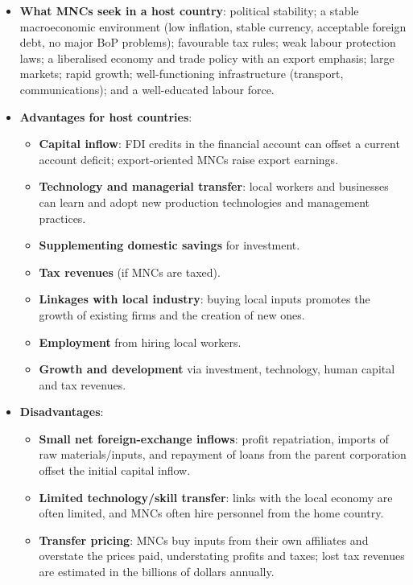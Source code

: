 \documentclass[a4paper,12pt]{article}
\begin{document}
\begin{itemize}
\begin{itemize}
    \item \textbf{Natural resource extraction} (oil, aluminium, bauxite) in resource-rich developing countries.
  \end{itemize}
  \item \textbf{What MNCs seek in a host country}: political stability; a stable macroeconomic environment (low inflation, stable currency, acceptable foreign debt, no major BoP problems); favourable tax rules; weak labour protection laws; a liberalised economy and trade policy with an export emphasis; large markets; rapid growth; well-functioning infrastructure (transport, communications); and a well-educated labour force.
  \item \textbf{Advantages for host countries}:
  \begin{itemize}
    \item \textbf{Capital inflow}: FDI credits in the financial account can offset a current account deficit; export-oriented MNCs raise export earnings.
    \item \textbf{Technology and managerial transfer}: local workers and businesses can learn and adopt new production technologies and management practices.
    \item \textbf{Supplementing domestic savings} for investment.
    \item \textbf{Tax revenues} (if MNCs are taxed).
    \item \textbf{Linkages with local industry}: buying local inputs promotes the growth of existing firms and the creation of new ones.
    \item \textbf{Employment} from hiring local workers.
    \item \textbf{Growth and development} via investment, technology, human capital and tax revenues.
  \end{itemize}
  \item \textbf{Disadvantages}:
  \begin{itemize}
    \item \textbf{Small net foreign-exchange inflows}: profit repatriation, imports of raw materials/inputs, and repayment of loans from the parent corporation offset the initial capital inflow.
    \item \textbf{Limited technology/skill transfer}: links with the local economy are often limited, and MNCs often hire personnel from the home country.
    \item \textbf{Transfer pricing}: MNCs buy inputs from their own affiliates and overstate the prices paid, understating profits and taxes; lost tax revenues are estimated in the billions of dollars annually.

\end{itemize}
\end{itemize}
\end{document}
